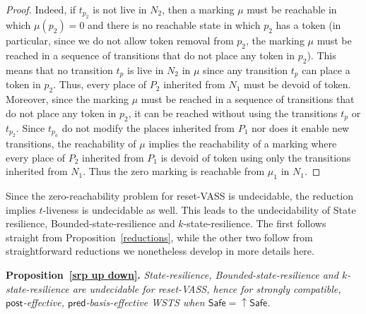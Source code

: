 \documentclass[runningheads]{llncs}
\newcommand{\pred}{\textsf{pred}}
\newcommand{\post}{\textsf{post}}
\newcommand{\Safe}{\textsf{Safe}}
\begin{document}
\begin{proof}
Indeed, if $t_{p_2}$ is not live in $N_2$, then a marking $\mu$ must be reachable in which $\mu(p_2) = 0$ and there is no reachable state in which $p_2$ has a token (in particular, since we do not allow token removal from $p_2$, the marking $\mu$ must be reached in a sequence of transitions that do not place any token in $p_2$).
This means that no transition $t_p$ is live in $N_2$ in $\mu$ since any transition $t_p$ can place a token in $p_2$. 
Thus, every place of $P_2$ inherited from $N_1$ must be devoid of token. Moreover, since the marking $\mu$ must be reached  in a sequence of transitions that do not place any token in $p_2$, 
it can be reached without using the transitions $t_p$ or $t_{p_2}$. Since $t_{p_a}$ do not modify the places inherited from $P_1$ nor does it enable new transitions, the reachability of $\mu$ implies the reachability of a marking where every place of $P_2$ inherited from $P_1$ is devoid of token using only the transitions inherited from $N_1$. Thus the zero marking is reachable from $\mu_1$ in $N_1$.
\end{proof}



Since the zero-reachability problem for reset-VASS is undecidable, the reduction implies {\sc $t$-liveness} is undecidable as well. This leads to the undecidability of {\sc State resilience}, {\sc Bounded-state-resilience} and
{\sc $k$-state-resilience}. 
The first follows straight from Proposition~\ref{reductions},
while the other two
follow from straightforward reductions
we nonetheless
develop in more details here.


\noindent
\textbf{Proposition~\ref{srp up down}.}
{\em {\sc State-resilience},
{\sc Bounded-state-resilience} and
{\sc $k$-state-resilience}
are undecidable for reset-VASS, hence for strongly compatible,
$\post$-effective, $\pred$-basis-effective WSTS
when
$\Safe=\mathop{\uparrow} \Safe$.
}
\end{document}
